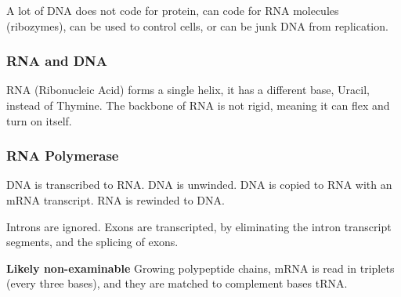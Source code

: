 \par\noindent A lot of DNA does not code for protein, can code for RNA molecules (ribozymes), can be used to control cells, or can be junk DNA from replication.

\subsubsection{RNA and DNA}
RNA (Ribonucleic Acid) forms a single helix, it has a different base, Uracil, instead of Thymine. The backbone of RNA is not rigid, meaning it can flex and turn on itself.

\subsubsection{RNA Polymerase}
DNA is transcribed to RNA. DNA is unwinded. DNA is copied to RNA with an mRNA transcript. RNA is rewinded to DNA.

Introns are ignored. Exons are transcripted, by eliminating the intron transcript segments, and the splicing of exons.


\textbf{Likely non-examinable} Growing polypeptide chains, mRNA is read in triplets (every three bases), and they are matched to complement bases tRNA.
\subsection{}